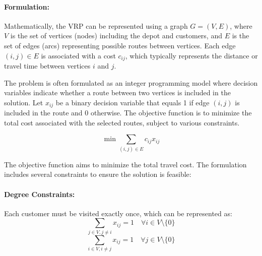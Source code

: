\documentclass[
]{article}
\begin{document}
\paragraph{Formulation:}
Mathematically, the VRP can be represented using a graph \( G = (V, E) \), where \( V \) is the set of vertices (nodes) including the depot and customers, and \( E \) is the set of edges (arcs) representing possible routes between vertices. Each edge \( (i, j) \in E \) is associated with a cost \( c_{ij} \), which typically represents the distance or travel time between vertices \( i \) and \( j \).

The problem is often formulated as an integer programming model where decision variables indicate whether a route between two vertices is included in the solution. Let \( x_{ij} \) be a binary decision variable that equals 1 if edge \( (i, j) \) is included in the route and 0 otherwise. The objective function is to minimize the total cost associated with the selected routes, subject to various constraints.

\begin{equation}
  \min \sum_{(i,j) \in E} c_{ij} x_{ij}
\end{equation}

The objective function aims to minimize the total travel cost. The formulation includes several constraints to ensure the solution is feasible:

\paragraph{Degree Constraints:}
Each customer must be visited exactly once, which can be represented as:
\begin{equation}
  \sum_{j \in V, j \neq i} x_{ij} = 1 \quad \forall i \in V \setminus \{0\}
\end{equation}
\begin{equation}
  \sum_{i \in V, i \neq j} x_{ij} = 1 \quad \forall j \in V \setminus \{0\}
\end{equation}
\end{document}
